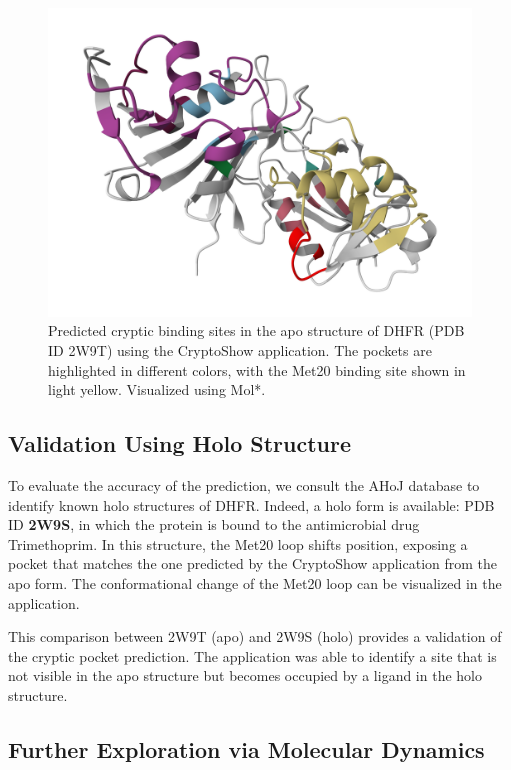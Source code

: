 \begin{figure}[htbp]
    \centering
    \includegraphics[width=\textwidth]{img/2w9t_prediction.png}
    \caption{Predicted cryptic binding sites in the apo structure of DHFR (PDB ID 2W9T) using the CryptoShow application. The pockets are highlighted in different colors, with the Met20 binding site shown in light yellow. Visualized using Mol*.}
    \label{fig:ui-cryptic-pocket}
\end{figure}

\subsection{Validation Using Holo Structure}
\label{subsec:holo-validation}

To evaluate the accuracy of the prediction, we consult the AHoJ database to identify known holo structures of DHFR. Indeed, a holo form is available: PDB ID \textbf{2W9S}, in which the protein is bound to the antimicrobial drug Trimethoprim. In this structure, the Met20 loop shifts position, exposing a pocket that matches the one predicted by the CryptoShow application from the apo form. The conformational change of the Met20 loop can be visualized in the application.

This comparison between 2W9T (apo) and 2W9S (holo) provides a validation of the cryptic pocket prediction. The application was able to identify a site that is not visible in the apo structure but becomes occupied by a ligand in the holo structure.

\subsection{Further Exploration via Molecular Dynamics}
\label{subsec:md-exploration}

